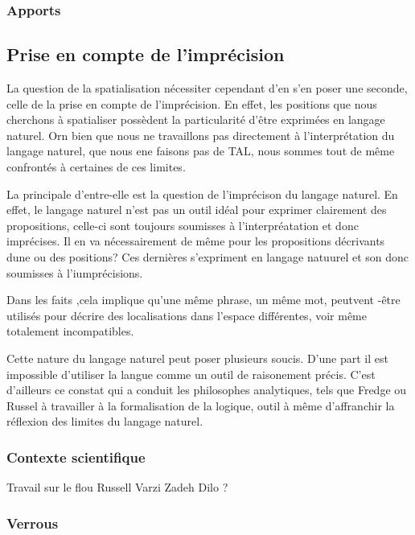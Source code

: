 \subsubsection{Apports}

\subsection{Prise en compte de l'imprécision}
\label{subsec:2-1-2}

La question de la spatialisation nécessiter cependant d'en s'en poser
une seconde, celle de la prise en compte de l'imprécision. En effet,
les positions que nous cherchons à spatialiser possèdent la
particularité d'être exprimées en langage naturel. Orn bien que nous
ne travaillons pas directement à l'interprétation du langage naturel,
\ie que nous ene faisons pas de TAL, nous sommes tout de même
confrontés à certaines de ces limites.

La principale d'entre-elle est la question de l'imprécison du langage
naturel. En effet, le langage naturel n'est pas un outil idéal pour
exprimer clairement des propositions, celle-ci sont toujours
soumisses à l'interpréatation et donc imprécises. Il en va
nécessairement de même pour les propositions décrivants dune ou des
positions? Ces dernières s'expriment en langage natuurel et son donc
soumisses à l'iumprécisions.

Dans les faits ,cela implique qu'une même phrase, un même mot,
peutvent -être utilisés pour décrire des localisations dans l'espace
différentes, voir même totalement incompatibles.

Cette nature du langage naturel peut poser plusieurs soucis. D'une
part il est impossible d'utiliser la langue comme un outil de
raisonement précis. C'est d'ailleurs ce constat qui a conduit les
philosophes analytiques, tels que Fredge ou Russel à travailler à la
formalisation de la logique, outil à même d'affranchir la réflexion
des limites du langage naturel.



\subsubsection{Contexte scientifique}

Travail sur le flou
Russell
Varzi
Zadeh
Dilo ?


\subsubsection{Verrous}

